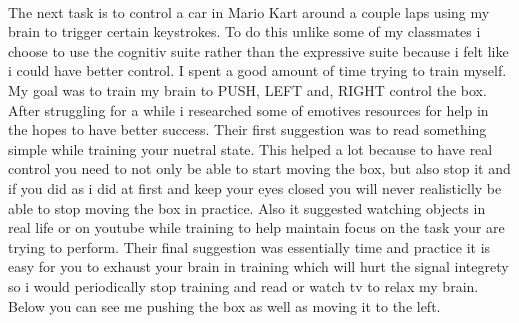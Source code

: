 \documentclass[12pt]{article}
\begin{document}
 			\paragraph{}
 				The next task is to control a car in Mario Kart around a couple laps using my brain 
 				to trigger certain keystrokes.  To do this unlike some of my classmates i choose to 
 				use the cognitiv suite rather than the expressive suite because i felt like i could 
 				have better control.  I spent a good amount of time trying to train myself.  My goal 
 				was to train my brain to PUSH, LEFT and, RIGHT control the box.  After struggling 
 				for a while i researched some of emotives resources for help in the hopes to have 
 				better success.  Their first suggestion was to read something simple while training 
 				your nuetral state.  This helped a lot because to have real control you need to not 
 				only be able to start moving the box, but also stop it and if you did as i did at 
 				first and keep your eyes closed you will never realisticlly be able to stop moving 
 				the box in practice.  Also it suggested watching objects in real life or on youtube 
 				while training to help maintain focus on the task your are trying to perform.  Their 
 				final suggestion was essentially time and practice it is easy for you to exhaust your
 				brain in training which will hurt the signal integrety so i would periodically stop 
 				training and read or watch tv to relax my brain.  Below you can see me pushing the 
 				box as well as moving it to the left.
\end{document}
